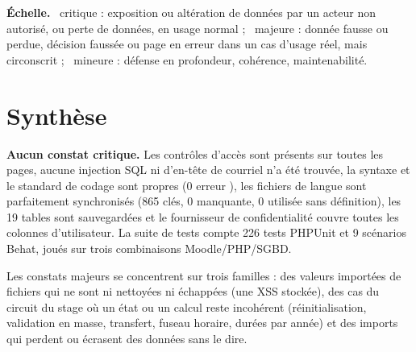\documentclass[11pt,a4paper]{article}
\newcommand{\grav}[1]{\textbf{\textcolor{#1}{\textbullet}}}
\newcommand{\maj}{\grav{orange}}
\newcommand{\mineure}{\grav{gray}}
\newcommand{\crit}{\grav{red}}
\begin{document}
\noindent\textbf{Échelle.} \crit~critique : exposition ou altération de données par un acteur
non autorisé, ou perte de données, en usage normal ; \maj~majeure : donnée fausse ou perdue,
décision faussée ou page en erreur dans un cas d'usage réel, mais circonscrit ; \mineure~mineure :
défense en profondeur, cohérence, maintenabilité.

\section{Synthèse}

\textbf{Aucun constat critique.} Les contrôles d'accès sont présents sur toutes les pages, aucune
injection SQL ni d'en-tête de courriel n'a été trouvée, la syntaxe et le standard de codage sont
propres (0 erreur ), les fichiers de langue sont parfaitement synchronisés (865 clés,
0 manquante, 0 utilisée sans définition), les 19 tables sont sauvegardées et le fournisseur de
confidentialité couvre toutes les colonnes d'utilisateur. La suite de tests compte 226 tests
PHPUnit et 9 scénarios Behat, joués sur trois combinaisons Moodle/PHP/SGBD.

Les constats majeurs se concentrent sur trois familles : des valeurs importées de fichiers qui
ne sont ni nettoyées ni échappées (une XSS stockée), des cas du circuit du stage où un état ou
un calcul reste incohérent (réinitialisation, validation en masse, transfert, fuseau horaire,
durées par année) et des imports qui perdent ou écrasent des données sans le dire.
\end{document}
